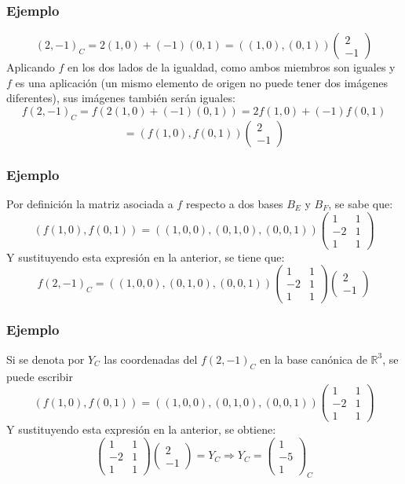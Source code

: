 \documentclass{beamer}
\begin{document}
    
 \begin{frame}
  \frametitle{Ejemplo}
\[(2,-1)_C = 2(1,0)+(-1)(0,1) = ((1,0),(0,1)) \left(\begin{array}{r}2 \\-1\end{array}\right)\]
Aplicando $f$ en los dos lados de la igualdad, como ambos miembros son iguales y $f$ es una aplicaci\'on (un mismo elemento de origen no puede tener dos im\'agenes diferentes), sus im\'agenes tambi\'en ser\'an iguales:
\[f(2,-1)_C = f(2(1,0)+(-1)(0,1)) = 2f(1,0)+(-1)f(0,1)  \]
\[=(f(1,0),f(0,1)) \left(\begin{array}{r}2 \\-1\end{array}\right)\]
  \end{frame}    
  
   \begin{frame}
  \frametitle{Ejemplo}
  Por definici\'on la matriz asociada a $f$ respecto a dos bases $B_E$ y $B_F$, se sabe que: 
\[(f(1,0),f(0,1)) = ((1,0,0),(0,1,0),(0,0,1)) \left(\begin{array}{rr}1&1 \\-2&1\\1&1\end{array}\right)\]
Y sustituyendo esta expresi\'on en la anterior, se tiene que: 
\[f(2,-1)_C = ((1,0,0),(0,1,0),(0,0,1)) \left(\begin{array}{rr}1&1 \\-2&1\\1&1\end{array}\right)    \left(\begin{array}{r}2 \\-1\end{array}\right)\]
 \end{frame}    

   \begin{frame}
  \frametitle{Ejemplo}
Si se denota por $Y_C$ las coordenadas del $f(2,-1)_C$ en la base can\'onica de $\mathbb R^3$, se puede escribir \[(f(1,0),f(0,1)) = ((1,0,0),(0,1,0),(0,0,1)) \left(\begin{array}{rr}1&1 \\-2&1\\1&1\end{array}\right)\]
Y sustituyendo esta expresi\'on en la anterior, se obtiene: 
\[\left(\begin{array}{rr}1&1 \\-2&1\\1&1\end{array}\right)    \left(\begin{array}{r}2 \\-1\end{array}\right) = Y_C \Longrightarrow Y_C = \left(\begin{array}{r}1 \\-5\\1\end{array}\right)_C \]
 \end{frame}    
 
\end{document}
